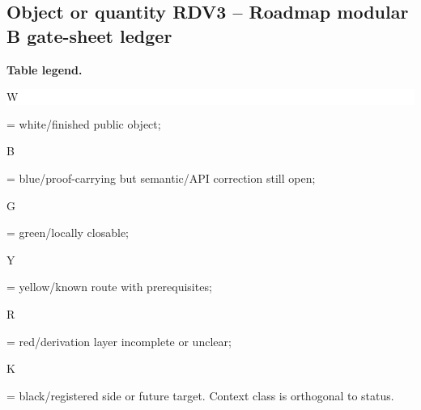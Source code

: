 \subsection*{Object or quantity RDV3 -- Roadmap modular B gate-sheet ledger}
\hypertarget{objproof:RDV3}{}
\par\smallskip\noindent\begin{minipage}{0.99\linewidth}\footnotesize\raggedright\textbf{Table legend.} \colorbox{white}{\strut W} = white/finished public object; \colorbox{cyan!20}{\strut B} = blue/proof-carrying but semantic/API correction still open; \colorbox{green!18}{\strut G} = green/locally closable; \colorbox{yellow!25}{\strut Y} = yellow/known route with prerequisites; \colorbox{red!20}{\strut R} = red/derivation layer incomplete or unclear; \colorbox{black!18}{\strut K} = black/registered side or future target. Context class is orthogonal to status.\end{minipage}\par\vspace{0.25em}
